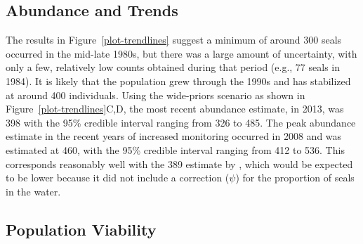 \documentclass[]{risa}\usepackage[]{graphicx}\usepackage[]{color}
\begin{document}
\subsection{Abundance and Trends}

The results in Figure~\ref{plot-trendlines} suggest a minimum of around 300 seals occurred in the mid-late 1980s, but there was a large amount of uncertainty, with only a few, relatively low counts obtained during that period (e.g., 77 seals in 1984).  It is likely that the population grew through the 1990s and has stabilized at around 400 individuals.  Using the wide-priors scenario as shown in Figure~\ref{plot-trendlines}C,D, the most recent abundance estimate, in 2013, was 398 with the 95\% credible interval ranging from 326 to 485. The peak abundance estimate in the recent years of increased monitoring occurred in 2008 and was estimated at 460, with the 95\% credible interval ranging from 412 to 536. This corresponds reasonably well with the 389 estimate by \citet{ABR:wild:2011}, which would be expected to be lower because it did not include a correction ($\psi$) for the proportion of seals in the water.

\subsection{Population Viability}
\end{document}
